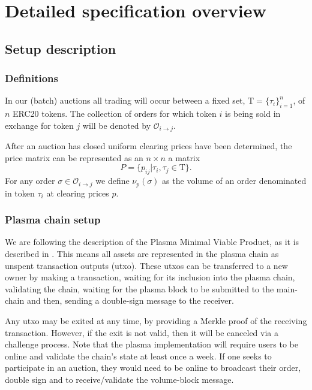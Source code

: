 \documentclass[11pt,parskip=full]{scrartcl}%
\newcommand{\Tau}{\mathrm{T}}
\def\pO{\mathcal{O}}
\def\ra{\rightarrow}
\newcommand*{\erc}{ERC20 }
\begin{document}
\newpage

\section{Detailed specification overview}
\subsection{Setup description}

\subsubsection{Definitions}

In our (batch) auctions all trading will occur between a fixed set, $\Tau = \{\tau_i\}_{i=1}^n$, of $n$ \erc tokens. The collection of orders for which token $i$ is being sold in exchange for token $j$ will be denoted by $\pO_{i\ra j}$. 

After an auction has closed uniform clearing prices have been determined, the price matrix can be represented as an $n\times n$ a matrix 
\[P = \{p_{ij}| \tau_i, \tau_j \in \Tau \}.\]
For any order $\sigma \in \pO_{i\ra j}$ we define $\nu_p(\sigma)$ as the volume of an order denominated in token $\tau_i$ at clearing prices $p$.

\subsubsection{Plasma chain setup}
We are following the description of the Plasma Minimal Viable Product, as it is described in \cite{MVP}. This means all assets are represented in the plasma chain as unspent transaction outputs (utxo). These utxos can be transferred to a new owner by making a transaction, waiting for its inclusion into the plasma chain, validating the chain, waiting for the plasma block to be submitted to the main-chain and then, sending a double-sign message to the receiver. 

Any utxo may be exited at any time, by providing a Merkle proof of the receiving transaction. However, if the exit is not valid, then it will be canceled via a challenge process.
Note that the plasma implementation will require users to be online and validate the chain's state at least once a week. If one seeks to participate in an auction, they would need to be online to broadcast their order, double sign and to receive/validate the volume-block message.
\end{document}
